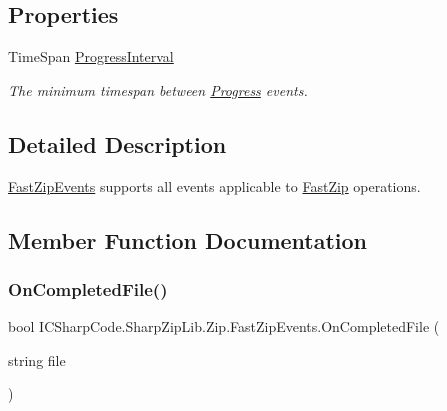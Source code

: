 \subsection*{Properties}
\begin{DoxyCompactItemize}
\item 
Time\+Span \hyperlink{class_i_c_sharp_code_1_1_sharp_zip_lib_1_1_zip_1_1_fast_zip_events_a69b0a98a7d78d1fd0a33b38e693f7800}{Progress\+Interval}
\begin{DoxyCompactList}\small\item\em The minimum timespan between \hyperlink{class_i_c_sharp_code_1_1_sharp_zip_lib_1_1_zip_1_1_fast_zip_events_ad53701f02850d1e5939d1b7638bb5e71}{Progress} events. \end{DoxyCompactList}\end{DoxyCompactItemize}


\subsection{Detailed Description}
\hyperlink{class_i_c_sharp_code_1_1_sharp_zip_lib_1_1_zip_1_1_fast_zip_events}{Fast\+Zip\+Events} supports all events applicable to \hyperlink{class_i_c_sharp_code_1_1_sharp_zip_lib_1_1_zip_1_1_fast_zip}{Fast\+Zip} operations. 



\subsection{Member Function Documentation}
\mbox{\label{class_i_c_sharp_code_1_1_sharp_zip_lib_1_1_zip_1_1_fast_zip_events_af8ca877e79d18f08f51abb7323397229}} 
\subsubsection{\texorpdfstring{On\+Completed\+File()}{OnCompletedFile()}}
{\footnotesize\ttfamily bool I\+C\+Sharp\+Code.\+Sharp\+Zip\+Lib.\+Zip.\+Fast\+Zip\+Events.\+On\+Completed\+File (\begin{DoxyParamCaption}\item[{string}]{file }\end{DoxyParamCaption})\hspace{0.3cm}{\ttfamily [inline]}}



